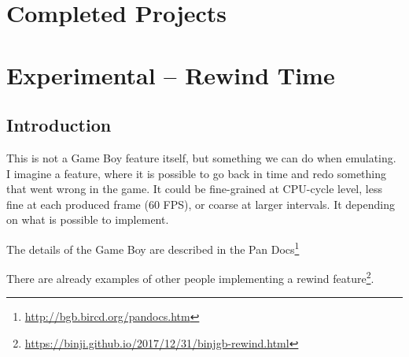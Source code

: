 \documentclass[11pt]{report} %
\begin{document}
%
%

\chapter*{Completed Projects}
\newpage

\chapter*{Experimental -- Rewind Time}
\section*{Introduction}
This is not a Game Boy feature itself, but something we can do when emulating. I imagine a feature, where it is possible to go back in time and redo something that went wrong in the game. It could be fine-grained at CPU-cycle level, less fine at each produced frame (60 FPS), or coarse at larger intervals. It depending on what is possible to implement.

The details of the Game Boy are described in the Pan Docs\footnote{\url{http://bgb.bircd.org/pandocs.htm}}

There are already examples of other people implementing a rewind feature\footnote{\url{https://binji.github.io/2017/12/31/binjgb-rewind.html}}.
\end{document}
